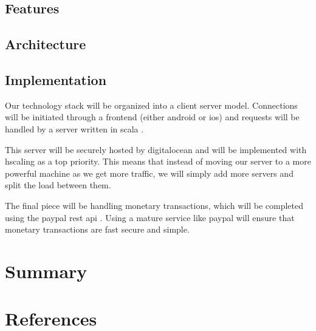 \documentclass[11pt]{article}
\begin{document}
\subsection{Features}


\subsection{Architecture}


\subsection{Implementation}

Our technology stack will be organized into a \gls{client} \gls{server} model. Connections will be initiated through a \gls{frontend} (either \gls{android} or \gls{ios}) and requests will be handled by a \gls{server} written in \gls{scala} \cite{scala}. 

This \gls{server} will be securely hosted by \gls{digitalocean} and will be implemented with \gls{hscaling} as a top priority. This means that instead of moving our \gls{server} to a more powerful machine as we get more traffic, we will simply add more \glspl{server} and split the load between them.

The final piece will be handling monetary transactions, which will be completed using the \gls{paypal} \gls{rest} \gls{api} \cite{paypal}. Using a mature service like \gls{paypal} will ensure that monetary transactions are fast secure and simple.

%
\section{Summary}


    
 
    \section{References} 
    
    

    
    
    \pagebreak
%  


%
%
%
\end{document}
